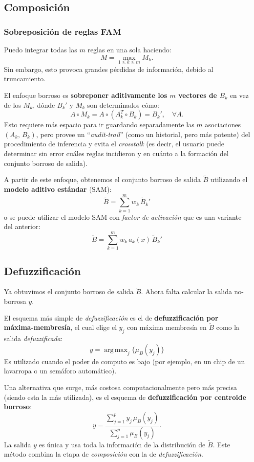 \documentclass[10pt,a4paper]{article}
\DeclareMathOperator*{\argmax}{arg\,\max}
\begin{document}
\subsection{Composición}

\subsubsection{Sobreposición de reglas FAM}

Puedo integrar todas las $m$ reglas en una sola haciendo:
\[M = \max_{1\leq k \leq m} M_k.\]
Sin embargo, esto provoca grandes pérdidas de información, debido al truncamiento.

El enfoque borroso es \textbf{sobreponer aditivamente los $m$ vectores de $B_k$} en vez de los $M_k$, dónde $B_k'$ y $M_k$ son determinados cómo:
\[
A\circ M_k = A \circ (A_k^T \circ B_k) = B_k',\quad \forall A.
\]
Esto requiere más espacio para ir guardando separadamente las $m$ asociaciones $(A_k,\,B_k)$, pero provee un ``\textit{audit-trail}'' (como un historial, pero más potente) del procedimiento de inferencia y evita el \textit{crosstalk} (es decir, el usuario puede determinar sin error cuáles reglas incidieron y en cuánto a la formación del conjunto borroso de salida).

A partir de este enfoque, obtenemos el conjunto borroso de salida $\tilde{B}$ utilizando el \textbf{modelo aditivo estándar} (SAM):
\[
\tilde{B} = \sum_{k=1}^m w_k \, \tilde{B}_k'
\]
o se puede utilizar el modelo SAM con \textit{factor de activación} que es una variante del anterior:
\[
\tilde{B} = \sum_{k=1}^m w_k \, a_k (x)\, \tilde{B}_k'
\]

\subsection{Defuzzificación}

Ya obtuvimos el conjunto borroso de salida $\tilde{B}$. Ahora falta calcular la salida no-borrosa $y$.

El esquema más simple de \textit{defuzzificación} es el de \textbf{defuzzificación por máxima-membresía}, el cual elige el $y_j$ con máxima membresía en $\tilde{B}$ como la salida \textit{defuzzificada}:
\[
y = \argmax_{j} \{\mu_B(y_j)\}
\]
Es utilizado cuando el poder de computo es bajo (por ejemplo, en un chip de un lavarropa o un semáforo automático).

Una alternativa que surge, más costosa computacionalmente pero más precisa (siendo esta la más utilizada), es el esquema de \textbf{defuzzificación por centroide borroso}:
\[
y = \frac{\sum_{j=1}^p y_j\, \mu_B (y_j)}{\sum_{j=1}^p\mu_B (y_j)}.
\]
La salida $y$ es única y usa toda la información de la distribución de $\tilde{B}$. Este método combina la etapa de \textit{composición} con la de \textit{defuzzificación}.
\end{document}
